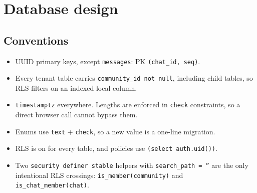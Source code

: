 \documentclass[11pt,a4paper]{article}
\newcommand{\code}[1]{\texttt{\small #1}}
\begin{document}
\section{Database design}
\subsection{Conventions}
\begin{itemize}
  \item UUID primary keys, except \code{messages}: PK \code{(chat\_id, seq)}.
  \item Every tenant table carries \code{community\_id not null}, including child tables, so RLS filters on an
        indexed local column.
  \item \code{timestamptz} everywhere. Lengths are enforced in \code{check} constraints, so a direct browser call
        cannot bypass them.
  \item Enums use \code{text} + \code{check}, so a new value is a one-line migration.
  \item RLS is on for every table, and policies use \code{(select auth.uid())}.
  \item Two \code{security definer stable} helpers with \code{search\_path = ''} are the only intentional RLS
        crossings: \code{is\_member(community)} and \code{is\_chat\_member(chat)}.
\end{itemize}
\end{document}

